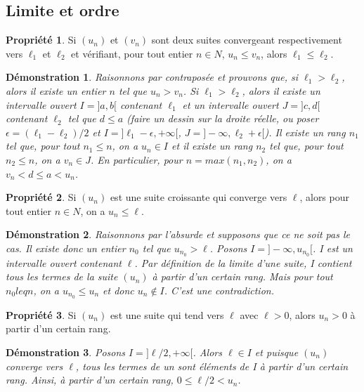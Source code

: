 \documentclass[a4paper,12pt,final]{article}
\newtheorem{Proof}{Démonstration}[section]
\theoremstyle{theorem}
\theoremstyle{definition}
\newtheorem{Propriete}{Propriété}[section]
\theoremstyle{definition}
\theoremstyle{definition}
\begin{document}
	\subsection{Limite et ordre}
	
\begin{Propriete}
	Si $(u_{n})$ et $(v_{n})$ sont deux suites convergeant respectivement vers $\ell_{1}$ et $\ell_{2}$ et vérifiant, pour tout entier $n \in N$, $u_{n} \leq v_{n}$, alors $\ell_{1} \leq \ell_{2}$. 
\end{Propriete}

\begin{Proof}
	Raisonnons par contraposée et prouvons que, si $\ell_{1} > \ell_{2}$, alors il existe un entier $n$ tel que $u_{n} > v_{n}$. Si $\ell_{1} > \ell_{2}$, alors il existe un intervalle ouvert $I=]a,b[$ contenant $\ell_{1}$ et un intervalle ouvert $J=]c,d[$ contenant $\ell_{2}$ tel que $d \leq a$ (faire un dessin sur la droite réelle, ou poser $\epsilon = (\ell_{1} − \ell_{2})/2$ et $I=]\ell_{1}−\epsilon,+\infty[$, $J=]−\infty,\ell_{2}+\epsilon[ $). Il existe un rang $n_{1}$ tel que, pour tout $n_{1}\leq n$, on a $u_{n} \in I$ et il existe un rang $n_{2}$ tel que, pour tout $n_{2}\leq n$, on a $v_{n} \in J$. En particulier, pour $n=max(n_{1},n_{2})$, on a $v_{n} < d \leq a < u_{n}$.
\end{Proof}

\begin{Propriete}
	Si $(u_{n})$ est une suite croissante qui converge vers $\ell$, alors pour tout entier $n \in N$, on a $u_{n} \leq \ell$.
\end{Propriete}

\begin{Proof}
	Raisonnons par l'absurde et supposons que ce ne soit pas le cas. Il existe donc un entier $n_{0}$ tel que $u_{n_{0}}> \ell$. Posons $I=]−\infty,u_{n_{0}}[$. I est un intervalle ouvert contenant $\ell$. Par définition de la limite d'une suite, I contient tous les termes de la suite $(u_{n})$ à partir d'un certain rang. Mais pour tout $n_{0} leq n$, on a $u_{n_{0}} \leq u_{n}$ et donc $u_{n}\notin I$. C'est une contradiction.
	
\end{Proof}

\begin{Propriete}
	Si $(u_{n})$ est une suite qui tend vers $\ell$ avec $\ell >0$, alors $u_{n}>0$ à partir d'un certain rang. 
\end{Propriete}

\begin{Proof}
	Posons $I=]\ell/2,+\infty[$. Alors $\ell \in I$ et puisque $(u_{n})$ converge vers $\ell$, tous les termes de un sont éléments de I à partir d'un certain rang. Ainsi, à partir d'un certain rang, $0 \leq \ell/2 < u_{n}$.
\end{Proof}
	
\end{document}
